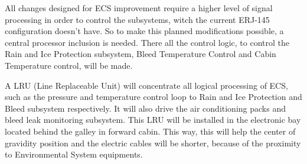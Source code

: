 ﻿All changes designed for ECS improvement require a higher level of signal processing in order to control the subsystems, witch the current ERJ-145 configuration doesn't have. So to make this planned modifications possible, a central processor inclusion is needed. There all the control logic, to control the Rain and Ice Protection subsystem, Bleed Temperature Control and Cabin Temperature control, will be made.

A LRU (Line Replaceable Unit) will concentrate all logical processing of ECS, such as the pressure and temperature control loop to Rain and Ice Protection and Bleed subsystem respectively. It will also drive the air conditioning packs and bleed leak monitoring subsystem. This LRU will be installed in the electronic bay located behind the galley in forward cabin. This way, this will help the center of gravidity position and the electric cables will be shorter, because of the proximity to Environmental System equipments.
